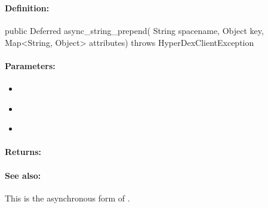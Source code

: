 \pagebreak
\subsubsection{}
\label{api:java:async_string_prepend}


\paragraph{Definition:}
\begin{javacode}
public Deferred async_string_prepend(
        String spacename,
        Object key,
        Map<String, Object> attributes) throws HyperDexClientException
\end{javacode}

\paragraph{Parameters:}
\begin{itemize}[noitemsep]
\item {}\\

\item {}\\

\item {}\\

\end{itemize}

\paragraph{Returns:}


\paragraph{See also:}  This is the asynchronous form of .

\pagebreak
\subsubsection{}
\label{api:java:uxact_string_prepend}


